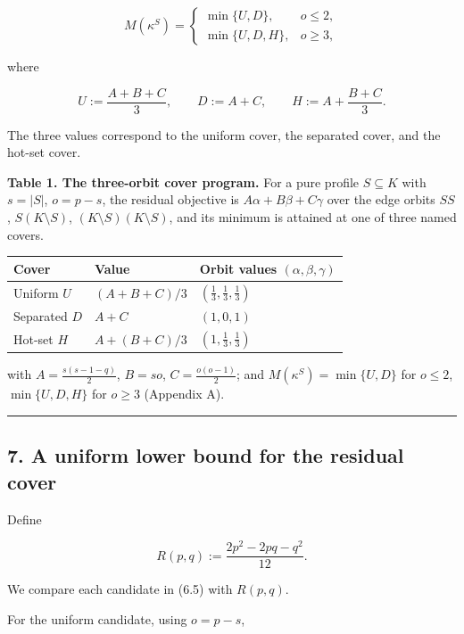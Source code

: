 \documentclass[
  american,
  11pt,
  a4paper,
]{article}
\newcounter{none} %
\begin{document}
\[
M(\kappa^S)
=
\begin{cases}
\min\{U,D\},&o\le2,\\[1mm]
\min\{U,D,H\},&o\ge3,
\end{cases}
\tag{6.5}
\]

where

\[
U:=\frac{A+B+C}{3},
\qquad
D:=A+C,
\qquad
H:=A+\frac{B+C}{3}.
\tag{6.6}
\]

The three values correspond to the uniform cover, the separated cover, and the hot-set cover.

\textbf{Table 1. The three-orbit cover program.} For a pure profile \(S\subseteq K\) with \(s=|S|\), \(o=p-s\), the residual objective is \(A\alpha+B\beta+C\gamma\) over the edge orbits \(SS\), \(S(K\setminus S)\), \((K\setminus S)(K\setminus S)\), and its minimum is attained at one of three named covers.

{\def\LTcaptype{none} %
\begin{longtable}[]{@{}lll@{}}
\toprule\noalign{}
Cover & Value & Orbit values \((\alpha,\beta,\gamma)\) \\
\midrule\noalign{}
\endhead
\bottomrule\noalign{}
\endlastfoot
Uniform \(U\) & \((A+B+C)/3\) & \((\tfrac13,\tfrac13,\tfrac13)\) \\
Separated \(D\) & \(A+C\) & \((1,0,1)\) \\
Hot-set \(H\) & \(A+(B+C)/3\) & \((1,\tfrac13,\tfrac13)\) \\
\end{longtable}
}

with \(A=\tfrac{s(s-1-q)}2\), \(B=so\), \(C=\tfrac{o(o-1)}2\); and \(M(\kappa^S)=\min\{U,D\}\) for \(o\le2\), \(\min\{U,D,H\}\) for \(o\ge3\) (Appendix A).

\begin{center}\rule{0.5\linewidth}{0.5pt}\end{center}

\subsection{7. A uniform lower bound for the residual cover}\label{a-uniform-lower-bound-for-the-residual-cover}

Define

\[
R(p,q)
:=
\frac{2p^2-2pq-q^2}{12}.
\tag{7.1}
\]

We compare each candidate in (6.5) with \(R(p,q)\).

For the uniform candidate, using \(o=p-s\),
\end{document}
